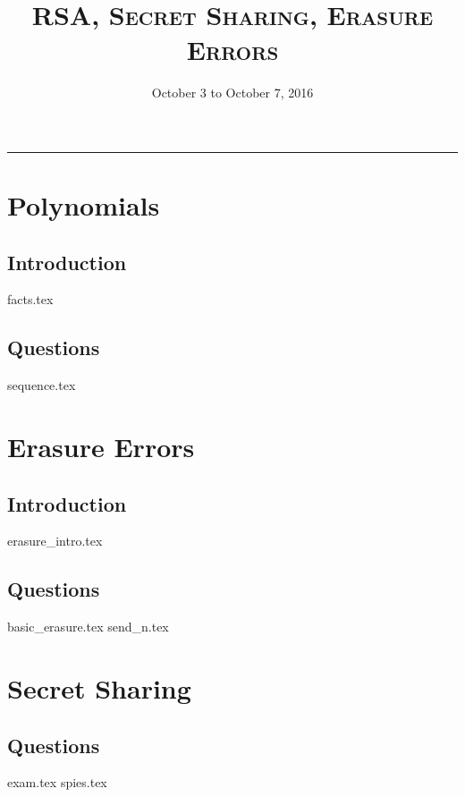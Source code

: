 \documentclass{exam}
\title{\textsc{RSA, Secret Sharing, Erasure Errors}}
\date{October 3 to October 7, 2016}
\begin{document}
\maketitle
\rule{\textwidth}{0.15em}
\fontsize{12}{15}\selectfont
\thispagestyle{empty}

\section{Polynomials}
\subsection{Introduction}
{facts.tex}
\subsection{Questions}
\begin{questions}
{sequence.tex}
\end{questions}

\section{Erasure Errors}
\subsection{Introduction}
{erasure_intro.tex}
\subsection{Questions}
\begin{questions}
{basic_erasure.tex}
{send_n.tex}
\end{questions}

\section{Secret Sharing}
\subsection{Questions}
\begin{questions}
{exam.tex}
{spies.tex}
\end{questions}
\end{document}
